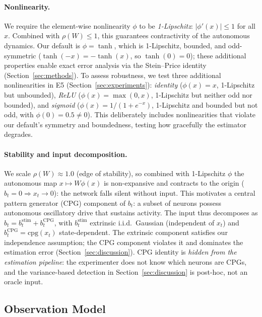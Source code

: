 \documentclass{article}
\begin{document}
\paragraph{Nonlinearity.}
We require the element-wise nonlinearity $\phi$ to be \emph{1-Lipschitz}: $|\phi'(x)| \leq 1$ for all $x$.
Combined with $\rho(W) \leq 1$, this guarantees contractivity of the autonomous dynamics.
Our default is $\phi = \tanh$, which is 1-Lipschitz, bounded, and odd-symmetric ($\tanh(-x) = -\tanh(x)$, so $\tanh(0) = 0$); these additional properties enable exact error analysis via the Stein--Price identity (Section~\ref{sec:methods}).
To assess robustness, we test three additional nonlinearities in E5 (Section~\ref{sec:experiments}):
\emph{identity} ($\phi(x) = x$, 1-Lipschitz but unbounded),
\emph{ReLU} ($\phi(x) = \max(0, x)$, 1-Lipschitz but neither odd nor bounded), and
\emph{sigmoid} ($\phi(x) = 1/(1+e^{-x})$, 1-Lipschitz and bounded but not odd, with $\phi(0) = 0.5 \neq 0$).
This deliberately includes nonlinearities that violate our default's symmetry and boundedness, testing how gracefully the estimator degrades.

\paragraph{Stability and input decomposition.}
We scale $\rho(W) \approx 1.0$ (edge of stability), so combined with 1-Lipschitz $\phi$ the autonomous map $x \mapsto W\phi(x)$ is non-expansive and contracts to the origin ($b_t = 0 \Rightarrow x_t \to 0$): the network falls silent without input.
This motivates a central pattern generator (CPG) component of $b_t$: a subset of neurons possess autonomous oscillatory drive \citep{marder2001central} that sustains activity. The input thus decomposes as $b_t = b_t^{\text{stim}} + b_t^{\text{CPG}}$, with $b_t^{\text{stim}}$ extrinsic i.i.d.\ Gaussian (independent of $x_t$) and $b_t^{\text{CPG}} = \text{cpg}(x_t)$ state-dependent. The extrinsic component satisfies our independence assumption; the CPG component violates it and dominates the estimation error (Section~\ref{sec:discussion}).
CPG identity is \emph{hidden from the estimation pipeline}: the experimenter does not know which neurons are CPGs, and the variance-based detection in Section~\ref{sec:discussion} is post-hoc, not an oracle input.

\subsection{Observation Model}
\end{document}
